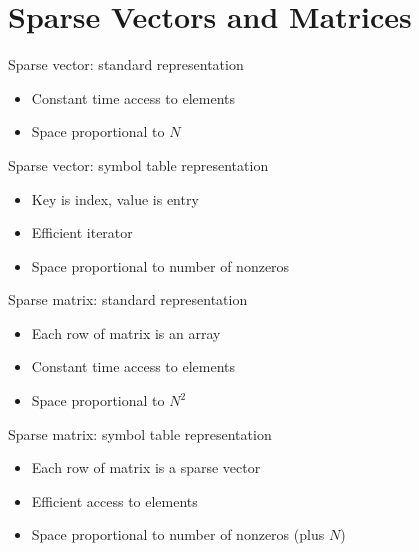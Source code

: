 \documentclass[8pt,a4paper,compress]{beamer}
\begin{document}
\section{Sparse Vectors and Matrices}
\begin{frame}[fragile]
\pause

Sparse vector: standard representation
\begin{itemize}
\item Constant time access to elements

\item Space proportional to $N$
\end{itemize}

\pause
\bigskip

Sparse vector: symbol table representation
\begin{itemize}
\item Key is index, value is entry

\item Efficient iterator

\item Space proportional to number of nonzeros
\end{itemize}

\pause
\bigskip

Sparse matrix: standard representation
\begin{itemize}
\item Each row of matrix is an array

\item Constant time access to elements

\item Space proportional to $N^2$
\end{itemize}

\pause
\bigskip

Sparse matrix: symbol table representation
\begin{itemize}
\item Each row of matrix is a sparse vector

\item Efficient access to elements

\item Space proportional to number of nonzeros (plus $N$)
\end{itemize}
\end{frame}
\end{document}
